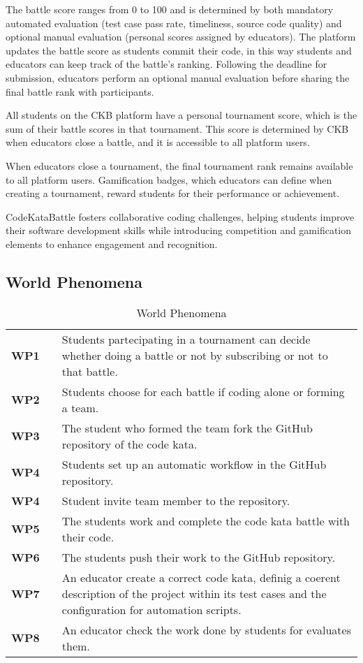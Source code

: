 The battle score ranges from 0 to 100 and is determined by both mandatory automated evaluation (test case pass rate, timeliness, source code quality) and optional manual evaluation (personal scores assigned by educators).
The platform updates the battle score as students commit their code, in this way students and educators can keep track of the battle's ranking.
Following the deadline for submission, educators perform an optional manual evaluation before sharing the final battle rank with participants.

All students on the CKB platform have a personal tournament score, which is the sum of their battle scores in that tournament.
This score is determined by CKB when educators close a battle, and it is accessible to all platform users.

When educators close a tournament, the final tournament rank remains available to all platform users.
Gamification badges, which educators can define when creating a tournament, reward students for their performance or achievement.

CodeKataBattle fosters collaborative coding challenges, helping students improve their software development skills while introducing competition and gamification elements to enhance engagement and recognition.

\subsection{World Phenomena}

\begin{table}[H]
    \centering
    \renewcommand{\arraystretch}{1.5}
    \begin{tabular}{l l p{12cm}}
        \hline
        \textbf{WP1} &  & Students partecipating in a tournament can decide whether doing a battle or not by subscribing or not to that battle. \\
        \textbf{WP2} &  & Students choose for each battle if coding alone or forming a team. \\
        \textbf{WP3} &  & The student who formed the team fork the GitHub repository of the code kata. \\
        \textbf{WP4} &  & Students set up an automatic workflow in the GitHub repository. \\
        \textbf{WP4} &  & Student invite team member to the repository. \\
        \textbf{WP5} &  & The students work and complete the code kata battle with their code. \\
        \textbf{WP6} &  & The students push their work to the GitHub repository. \\
        \textbf{WP7} &  & An educator create a correct code kata, definig a coerent description of the project within its test cases and the configuration for automation scripts. \\
        \textbf{WP8} &  & An educator check the work done by students for evaluates them. \\
        \hline
    \end{tabular}
    \caption{World Phenomena}
\end{table}

